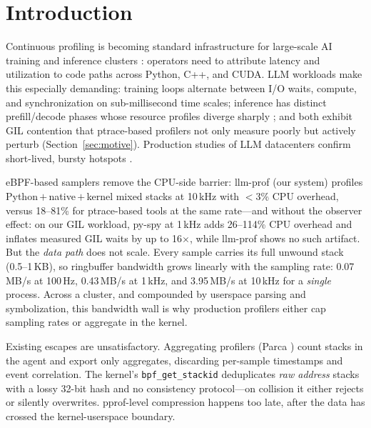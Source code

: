 \documentclass[letterpaper,twocolumn,10pt]{article}
\begin{document}
\section{Introduction}

Continuous profiling is becoming standard infrastructure for large-scale
AI training and inference clusters \cite{parca,pyroscope,otelprof}: operators
need to attribute latency and utilization to code paths across Python, C++,
and CUDA. LLM workloads make this especially demanding: training loops
alternate between I/O waits, compute, and synchronization on sub-millisecond
time scales; inference has distinct prefill/decode phases whose resource
profiles diverge sharply \cite{splitwise,sarathi}; and both exhibit GIL
contention \cite{parpython,pep703} that ptrace-based profilers not only
measure poorly but actively perturb (Section~\ref{sec:motive}). Production
studies of LLM datacenters confirm short-lived, bursty hotspots
\cite{llmdc}.

eBPF-based samplers remove the CPU-side barrier: llm-prof (our system)
profiles Python\,$+$\,native\,$+$\,kernel mixed stacks at 10\,kHz with
$<$3\% CPU overhead, versus 18--81\% for ptrace-based tools at the same
rate---and without the observer effect: on our GIL workload, py-spy at
1\,kHz adds 26--114\% CPU overhead and inflates measured GIL waits by up to
16$\times$, while llm-prof shows no such artifact. But the \emph{data path}
does not scale. Every sample carries its full unwound stack (0.5--1\,KB),
so ringbuffer bandwidth grows linearly with the sampling rate:
0.07\,MB/s at 100\,Hz, 0.43\,MB/s at 1\,kHz, and 3.95\,MB/s at 10\,kHz for
a \emph{single} process. Across a cluster, and compounded by userspace
parsing and symbolization, this bandwidth wall is why production profilers
either cap sampling rates or aggregate in the kernel.

Existing escapes are unsatisfactory. Aggregating profilers (Parca
\cite{parca}) count stacks in the agent and export only aggregates,
discarding per-sample timestamps and event correlation. The kernel's
\texttt{bpf\_get\_stackid} \cite{bpfdocs} deduplicates \emph{raw address}
stacks with a lossy 32-bit hash and no consistency protocol---on collision
it either rejects or silently overwrites. pprof-level compression
\cite{otelprof} happens too late, after the data has crossed the
kernel-userspace boundary.
\end{document}
